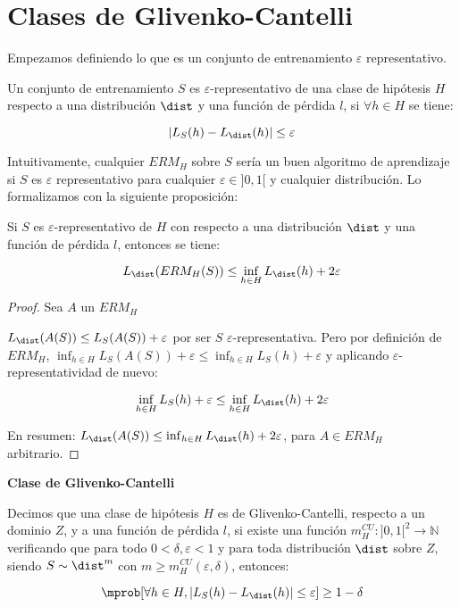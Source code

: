 \section{Clases de Glivenko-Cantelli}

Empezamos definiendo lo que es un conjunto de entrenamiento $\varepsilon$ representativo.

\begin{definition}
 Un conjunto de entrenamiento $S$ es $\varepsilon$-representativo de una clase de hipótesis $H$ respecto a una
 distribución $\dist$ y una función de pérdida $l$, si $\forall h\in H$ se tiene:
 
 \[|L_S(h) - L_{\dist}(h)| \le \varepsilon\]
\end{definition}

Intuitivamente, cualquier $ERM_H$ sobre $S$ sería un buen algoritmo de aprendizaje 
si $S$ es $\varepsilon$ representativo para cualquier $\varepsilon \in ]0,1[$ y cualquier distribución. 
Lo formalizamos con la siguiente proposición:

\begin{fact}
 Si $S$ es $\varepsilon$-representativo de $H$ con respecto a una distribución $\dist$ y una función de 
 pérdida $l$, entonces se tiene:
 
 \[L_{\dist}(ERM_H(S)) \le \inf_{h\in H} L_{\dist}(h) + 2\varepsilon\]
 
 \label{fact:epsilon-rep}
\end{fact}

\begin{proof}
 Sea $A$ un $ERM_H$
 
 $L_{\dist}(A(S)) \le L_S(A(S)) + \varepsilon$ por ser $S$ $\varepsilon$-representativa. Pero por definición de 
 $ERM_H$, $\inf_{h\in H} L_S(A(S)) + \varepsilon \le \inf_{h\in H}L_S(h) + \varepsilon$ y aplicando
 $\varepsilon$-representatividad de nuevo:
 
 \[\inf_{h\in H} L_S(h) + \varepsilon \le \inf_{h\in H} L_{\dist}(h) + 2\varepsilon\]
 
 En resumen: $L_{\dist}(A(S)) \le \inf_{h\in H} L_{\dist}(h) + 2\varepsilon$, para $A \in ERM_H$ arbitrario.
\end{proof}


\begin{definition} \textbf{Clase de Glivenko-Cantelli}

Decimos que una clase de hipótesis $H$ es de Glivenko-Cantelli, respecto a un dominio $Z$, y a 
una función de pérdida $l$, si existe una función ${m_{H}^{CU}: ]0,1[^2 \rightarrow \mathbb{N}}$ 
verificando que para todo $0 < \delta, \varepsilon < 1$ y para toda distribución $\dist$ sobre $Z$, siendo 
$S\sim \dist^m$ con $m \ge m_{H}^{CU}(\varepsilon, \delta)$, 
entonces:

\[\mprob [\forall h\in H, |L_S(h) - L_{\dist}(h)| \le \varepsilon] \ge 1-\delta\]
\end{definition}

